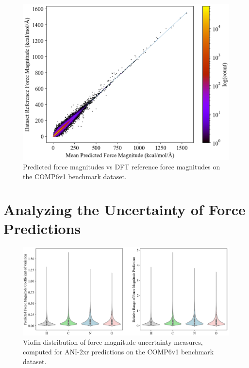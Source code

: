 \begin{figure}[H]
    \centering
    \includegraphics[width=1\linewidth]{Images/2xr_forces/2xr_comp6v1_force-dft-vs-mean_ani.png}
    \caption[Mean predicted atomic force magnitude vs DFT reference]{Predicted force magnitudes vs DFT reference force magnitudes on the COMP6v1 benchmark dataset.}
    \label{fig:2xr_comp6v1-forces-ani_vs_ref}
\end{figure}

\section{Analyzing the Uncertainty of Force Predictions}
\label{sec:analyzing_force_uncertainty}

\begin{figure}[H]
    \centering
    \includegraphics[width=1\linewidth]{Images/2xr_forces/2xr_comp6v1_force-uncertainty_violin.png}
    \caption[Uncertainty in force magnitude predictions: violin distribution]{Violin distribution of force magnitude uncertainty measures, computed for ANI-2xr predictions on the COMP6v1 benchmark dataset.}
    \label{fig:2xr_comp6v1-force_uncertainty-violin}
\end{figure}


